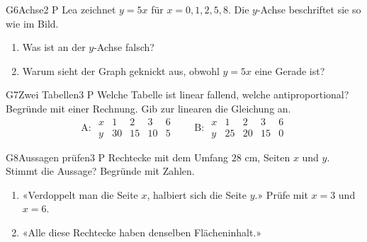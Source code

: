 \documentclass[11pt]{article}
\begin{document}
\begin{lpaufgabe}{G6}{Achse}{2 P}
Lea zeichnet $y = 5x$ für $x = 0, 1, 2, 5, 8$. Die $y$-Achse beschriftet sie so wie im Bild.
\begin{enumerate}[label=(\alph*),leftmargin=*,itemsep=3pt]
\item Was ist an der $y$-Achse falsch?
\item Warum sieht der Graph geknickt aus, obwohl $y = 5x$ eine Gerade ist?
\end{enumerate}

\smallskip
\begin{minipage}[t]{0.42\linewidth}\vspace{0pt}
\end{minipage}\hfill
\begin{minipage}[t]{0.55\linewidth}\vspace{0pt}
\end{minipage}
\end{lpaufgabe}


\begin{lpaufgabe}{G7}{Zwei Tabellen}{3 P}
Welche Tabelle ist linear fallend, welche antiproportional? Begründe mit einer Rechnung. Gib zur linearen die Gleichung an.
\[ \text{A: } \begin{array}{c|cccc} x & 1 & 2 & 3 & 6 \\ \hline y & 30 & 15 & 10 & 5 \end{array} \qquad
   \text{B: } \begin{array}{c|cccc} x & 1 & 2 & 3 & 6 \\ \hline y & 25 & 20 & 15 & 0 \end{array} \]
\end{lpaufgabe}

\begin{lpaufgabe}{G8}{Aussagen prüfen}{3 P}
Rechtecke mit dem Umfang $28$ cm, Seiten $x$ und $y$. Stimmt die Aussage? Begründe mit Zahlen.
\begin{enumerate}[label=(\alph*),leftmargin=*,itemsep=3pt]
\item «Verdoppelt man die Seite $x$, halbiert sich die Seite $y$.» Prüfe mit $x = 3$ und $x = 6$.
\item «Alle diese Rechtecke haben denselben Flächeninhalt.»
\end{enumerate}
\end{lpaufgabe}
\end{document}
